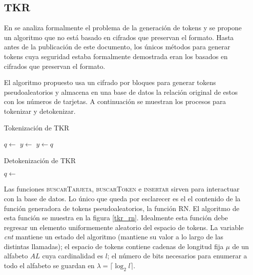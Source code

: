 %
%

\subsection{TKR}

En \cite{doc_sandra} se analiza formalmente el problema de la generación de
tokens y se propone un algoritmo que no está basado en cifrados que preservan el
formato. Hasta antes de la publicación de este documento, los únicos métodos
para generar tokens cuya seguridad estaba formalmente demostrada eran los
basados en cifrados que preservan el formato.

El algoritmo propuesto usa un cifrado por bloques para generar tokens
pseudoaleatorios y almacena en una base de datos la relación original de estos
con los números de tarjetas. A continuación se muestran los procesos para
tokenizar y detokenizar.

\begin{algorithm}
  \caption{\label{tkr_tokenizacion} Tokenización de TKR}
  \begin{algorithmic}[1]
      \State $ q \gets $ 
        \State $ y \gets $ 
        \State {}
      \Else
        \State $ y \gets q $
      \EndIf
      \State {}
    \EndFunction
  \end{algorithmic}
\end{algorithm}

\begin{algorithm}
  \caption{\label{tkr_detokenizacion} Detokenización de TKR}
  \begin{algorithmic}[1]
      \State $ q \gets $ 
        \State {}
      \Else
        \State {}
      \EndIf
    \EndFunction
  \end{algorithmic}
\end{algorithm}

Las funciones \textsc{buscarTarjeta}, \textsc{buscarToken} e \textsc{insertar}
sirven para interactuar con la base de datos. Lo único que queda por esclarecer
es el el contenido de la función generadora de tokens pseudoaleatorios, la
función \textsc{RN}. El algoritmo de esta función se muestra en la figura
\ref{tkr_rn}. Idealmente esta función debe regresar un elemento uniformemente
aleatorio del espacio de tokens. La variable \textit{cnt} mantiene un
estado del algoritmo (mantiene su valor a lo largo de las distintas llamadas);
el espacio de tokens contiene cadenas de longitud fija $ \mu $ de un alfabeto
$ AL $ cuya cardinalidad es $ l $; el número de bits necesarios para enumerar a
todo el alfabeto se guardan en $ \lambda = \lceil \log_2 l \rceil$.

